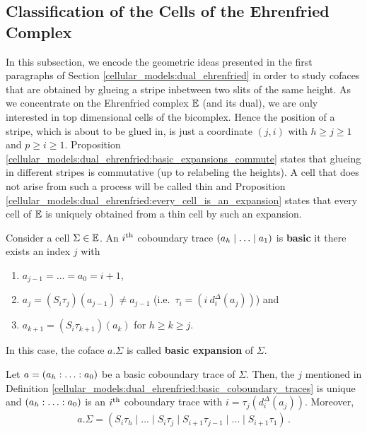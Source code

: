 \subsection{Classification of the Cells of the Ehrenfried Complex}
\label{cellular_models:dual_ehrenfried:classification_of_the_cells}
In this subsection, we encode the geometric ideas presented in the first paragraphs of Section \ref{cellular_models:dual_ehrenfried}
in order to study cofaces that are obtained by glueing a stripe inbetween two slits of the same height.
As we concentrate on the Ehrenfried complex $\mathbb E$ (and its dual), we are only interested in top dimensional cells of the bicomplex.
Hence the position of a stripe, which is about to be glued in, is just a coordinate $(j,i)$ with $h \ge j \ge 1$ and $p \ge i \ge 1$.
Proposition \ref{cellular_models:dual_ehrenfried:basic_expansions_commute} states that glueing in different stripes is commutative (up to relabeling the heights).
A cell that does not arise from such a process will be called thin and Proposition \ref{cellular_models:dual_ehrenfried:every_cell_is_an_expansion}
states that every cell of $\mathbb E$ is uniquely obtained from a thin cell by such an expansion.

\begin{defi}
    \label{cellular_models:dual_ehrenfried:basic_coboundary_traces}
    Consider a cell $\Sigma \in \mathbb E$.
    An $i^{\text{th}}$ coboundary trace $\inhom[a]$ is {\bfseries basic} it there exists an index $j$ with
    \begin{enumerate}
        \item $a_{j-1} = \ldots = a_0 = i+1$,
        \item $a_j = (S_i\tau_j)(a_{j-1}) \neq a_{j-1}$ (i.e.\ $\tau_i = (i\ d^\Delta_i(a_j))$) and
        \item $a_{k+1} = (S_i\tau_{k+1})(a_k)$ for $h \ge k \ge j$.
    \end{enumerate}
    In this case, the coface $a.\Sigma$ is called {\bfseries basic expansion} of $\Sigma$.
\end{defi}

\begin{lem}
    \label{cellular_models:dual_ehrenfried:basic_coboundary_traces_have_unique_j_and_i}
    Let $a = \homog[a]$ be a basic coboundary trace of $\Sigma$.
    Then, the $j$ mentioned in Definition \ref{cellular_models:dual_ehrenfried:basic_coboundary_traces} is unique and
    $\homog[a]$ is an $i^{\text{th}}$ coboundary trace with $i = \tau_j( d_i^\Delta(a_j) )$.
    Moreover,
    \begin{align}
        \label{cellular_models:dual_ehrenfried:basic_coboundary_trace_applied_to_cell}
        a.\Sigma = (S_i\tau_h \mid \ldots \mid S_i\tau_j \mid S_{i+1}\tau_{j-1} \mid \ldots \mid S_{i+1}\tau_1) \,.
    \end{align}

\end{lem}

